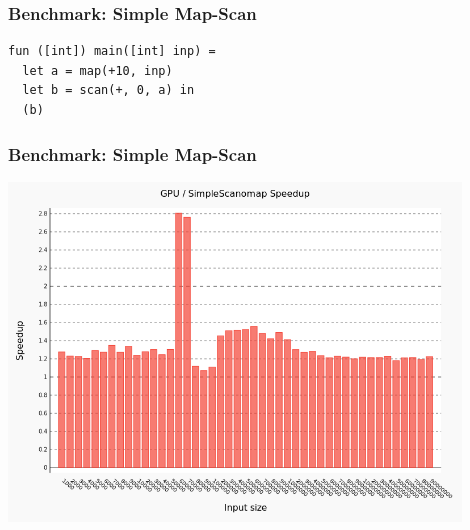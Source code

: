 \documentclass{beamer}
\begin{document}
\begin{frame}[fragile]
 \frametitle{Benchmark: Simple Map-Scan}
\begin{lstlisting}
fun ([int]) main([int] inp) =
  let a = map(+10, inp)
  let b = scan(+, 0, a) in
  (b)
\end{lstlisting}
\end{frame}

\begin{frame}
 \frametitle{Benchmark: Simple Map-Scan}
    \includegraphics[width=0.9\textwidth]{../images/comparing.png}
\end{frame}
\end{document}
